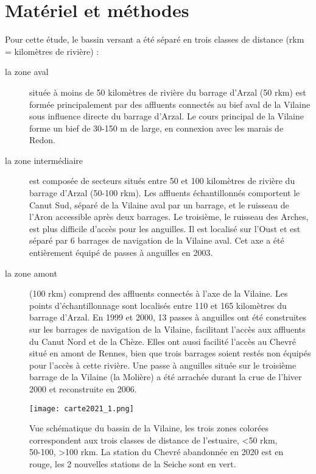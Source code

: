 \documentclass[10pt,twocolumn,titlepage,twoside]{article}\usepackage[]{graphicx}\usepackage[]{color}
\begin{document}


\newpage
\renewcommand{\contentsname}{Sommaire:}
\tableofcontents



\bigskip


\section{Matériel et méthodes}




Pour cette étude, le bassin versant a été séparé en trois
classes de distance (rkm = kilomètres de rivière) :
\begin{description}
\item [la zone aval] située
à moins de 50 kilomètres de rivière du barrage
d'Arzal (50 rkm) est formée principalement
par des affluents connectés au bief aval de la Vilaine sous influence
directe du barrage d'Arzal. Le cours principal de la
Vilaine forme un bief de 30-150 m de large, en connexion avec les
marais de Redon.
\item [la zone intermédiaire] est composée de secteurs
situés entre 50 et 100 kilomètres de rivière du barrage
d'Arzal (50-100 rkm). Les affluents échantillonnés
comportent le Canut Sud, séparé de la Vilaine aval par un barrage,
et le ruisseau de l'Aron accessible après deux
barrages. Le troisième, le ruisseau des Arches, est plus difficile
d'accès pour les anguilles. Il est localisé sur
l'Oust et est séparé par 6 barrages de navigation
de la Vilaine aval. Cet axe a été entièrement équipé de
passes à anguilles en 2003.
\item [la zone amont] (100 rkm) comprend des affluents connectés à
l'axe de la Vilaine. Les points
d'échantillonnage sont localisés entre 110 et 165
kilomètres du barrage d'Arzal. En 1999 et 2000, 13
passes à anguilles ont été construites sur les barrages de
navigation de la Vilaine, facilitant l'accès aux
affluents du Canut Nord et de la Chèze. Elles ont aussi facilité
l'accès au Chevré situé en amont de Rennes, bien
que trois barrages soient restés non équipés pour
l'accès à cette rivière. Une passe à anguilles
située sur le troisième barrage de la Vilaine (la Molière) a
été arrachée durant la crue de l'hiver 2000 et
reconstruite en 2006.
\end{description}
\begin{figure}[htbp]
\centering
\texttt{[image: carte2021\_1.png]}
\caption[Vue schématique du bassin de la Vilaine]{Vue schématique du bassin de
la Vilaine, les trois zones colorées correspondent aux trois classes de
distance de l'estuaire, <50 rkm, 50-100, >100 rkm. La station du Chevré
abandonnée en 2020 est en rouge, les 2 nouvelles stations de la Seiche sont en
vert. }
\label{fig_carte}
\end{figure}
\end{document}
